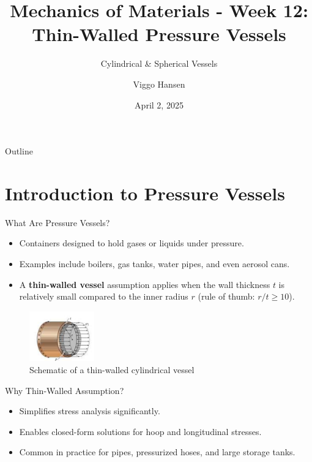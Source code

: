 \documentclass[aspectratio=169]{beamer}
\title{Mechanics of Materials - Week 12: Thin-Walled Pressure Vessels}
\subtitle{Cylindrical \& Spherical Vessels}
\author{Viggo Hansen}
\date{April 2, 2025}
\begin{document}
\begin{frame}
  \titlepage
\end{frame}


\begin{frame}{Outline}
  \tableofcontents
\end{frame}

\section{Introduction to Pressure Vessels}

\begin{frame}{What Are Pressure Vessels?}
  \begin{itemize}
    \item Containers designed to hold gases or liquids under pressure.
    \item Examples include boilers, gas tanks, water pipes, and even aerosol cans.
    \item A \textbf{thin-walled vessel} assumption applies when the wall thickness $t$ is relatively small compared to the inner radius $r$ (rule of thumb: $r/t \geq 10$).
  \end{itemize}
  \vfill
  \begin{figure}
    \centering
    \includegraphics[width=0.25\textwidth]{cyl.png} %
    \caption{Schematic of a thin-walled cylindrical vessel}
  \end{figure}
\end{frame}

\begin{frame}{Why Thin-Walled Assumption?}
  \begin{itemize}
    \item Simplifies stress analysis significantly.
    \item Enables closed-form solutions for hoop and longitudinal stresses.
    \item Common in practice for pipes, pressurized hoses, and large storage tanks.
  \end{itemize}
\end{frame}
\end{document}
